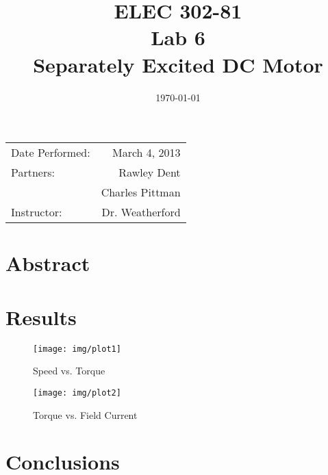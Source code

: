 \documentclass{article}
\author{}
\title{ELEC 302-81\\ Lab 6\\ Separately Excited DC Motor}
\date{\today}
\begin{document}
\maketitle

\begin{center}
  \begin{tabular}{lr}
    Date Performed: & March 4, 2013 \\
    Partners: & Rawley Dent \\
              & Charles Pittman \\
    Instructor: & Dr. Weatherford
  \end{tabular}
\end{center}

\pagebreak


\section{Abstract}


\section{Results}

\begin{figure}[H]
  \centering
  \texttt{[image: img/plot1]}
  \caption{Speed vs. Torque}
  \label{fig:plot4}
\end{figure}

\begin{figure}[H]
  \centering
  \texttt{[image: img/plot2]}
  \caption{Torque vs. Field Current}
  \label{fig:plot5}
\end{figure}

\section{Conclusions}

\end{document}
